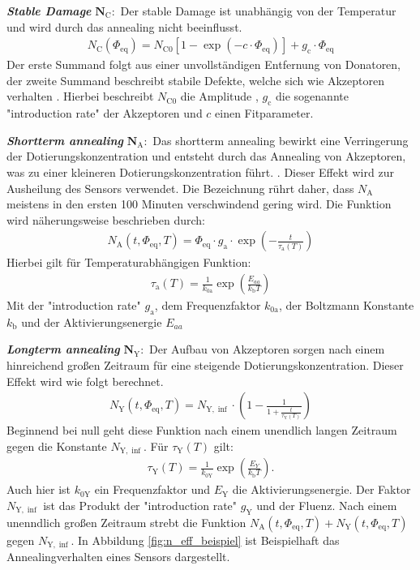 \textbf{\textit{Stable Damage}} $\symbf{N_{\mathrm{C}}}:$ Der stable Damage ist unabhängig von der Temperatur und wird durch das annealing nicht beeinflusst.
\begin{align}
  N_{\mathrm{C}}(\Phi_{\mathrm{eq}}) = N_{\mathrm{C0}}[1-\exp{(-c \cdot \Phi_{\mathrm{eq}})}] + g_{\mathrm{c}} \cdot \Phi_{\mathrm{eq}}
\end{align}
Der erste Summand folgt aus einer unvollständigen Entfernung von Donatoren, der zweite Summand beschreibt stabile Defekte, welche sich wie Akzeptoren verhalten \cite{beyer}.
Hierbei beschreibt $N_{\mathrm{C0}}$ die Amplitude , $g_{\mathrm{c}}$ die sogenannte "introduction rate" der Akzeptoren und $c$ einen Fitparameter.

\textbf{\textit{Shortterm annealing}} $\symbf{N_{\mathrm{A}}}:$ Das shortterm annealing bewirkt eine Verringerung der Dotierungskonzentration und entsteht durch
das Annealing von Akzeptoren, was zu einer kleineren Dotierungskonzentration führt. . Dieser Effekt wird
zur Ausheilung des Sensors verwendet. Die Bezeichnung rührt daher, dass $N_{\mathrm{A}}$ meistens in den ersten 100 Minuten verschwindend gering wird. Die
Funktion wird näherungsweise beschrieben durch:
\begin{align}
  N_{\mathrm{A}}(t, \Phi_{\mathrm{eq}}, T) = \Phi_{\mathrm{eq}} \cdot g_{\mathrm{a}} \cdot \exp{\left(-\frac{t}{\tau_{\mathrm{a}}(T)}\right)}
\end{align}
Hierbei gilt für Temperaturabhängigen Funktion:
\begin{align}
  \tau_{\mathrm{a}}(T) = \frac{1}{k_{0\mathrm{a}}}\exp{\left(\frac{E_{aa}}{k_{\mathrm{b}}T}\right)}
\end{align}
Mit der "introduction rate" $g_{\mathrm{a}}$, dem Frequenzfaktor $k_{0\mathrm{a}}$, der Boltzmann Konstante $k_{\mathrm{b}}$ und
der Aktivierungsenergie $E_{aa}$


\textbf{\textit{Longterm annealing}} $\symbf{N_{\mathrm{Y}}}:$ Der Aufbau von
Akzeptoren sorgen nach einem hinreichend großen Zeitraum für eine steigende
Dotierungskonzentration. Dieser Effekt wird wie folgt berechnet.
\begin{align}
  N_{\mathrm{Y}}(t, \Phi_{\mathrm{eq}}, T)     = N_{\mathrm{Y , \inf}}\cdot \left(1 - \frac{1}{1 + \frac{t}{\tau_{\mathrm{Y}}(T)}}\right)
\end{align}
Beginnend bei null geht diese Funktion nach einem unendlich langen Zeitraum gegen die Konstante $N_{\mathrm{Y, \inf}}$.
Für $\tau_{\mathrm{Y}}(T)$ gilt:
\begin{align}
  \tau_{\mathrm{Y}}(T) = \frac{1}{k_{0\mathrm{Y}}}\exp{\left(\frac{E_{Y}}{k_{\mathrm{b}}T}\right)}.
\end{align}
Auch hier ist $k_{0\mathrm{Y}}$ ein Frequenzfaktor und $E_{\mathrm{Y}}$ die Aktivierungsenergie. Der Faktor $N_{\mathrm{Y , \inf}}$
ist das Produkt der "introduction rate" $g_{\mathrm{Y}}$ und der Fluenz. Nach einem unenndlich großen Zeitraum strebt
die Funktion $N_{\mathrm{A}}(t, \Phi_{\mathrm{eq}}, T) + N_{\mathrm{Y}}(t, \Phi_{\mathrm{eq}}, T)$ gegen $N_{\mathrm{Y , \inf}}$.
In Abbildung \ref{fig:n_eff_beispiel} ist Beispielhaft das Annealingverhalten eines
Sensors dargestellt.

